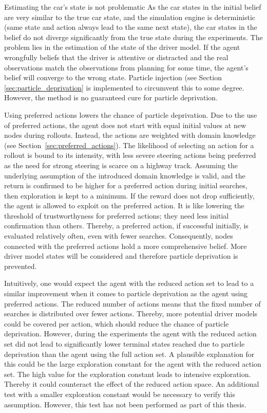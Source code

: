 Estimating the car's state is not problematic As the car states in the initial belief are very similar to the true car state, and the simulation engine is deterministic (same state and action always lead to the same next state), the car states in the belief do not diverge significantly from the true state during the experiments. The problem lies in the estimation of the state of the driver model. If the agent wrongfully beliefs that the driver is attentive or distracted and the real observations match the observations from planning for some time, the agent's belief will converge to the wrong state. Particle injection (see Section \ref{sec:particle_deprivation} is implemented to circumvent this to some degree. However, the method is no guaranteed cure for particle deprivation.

Using preferred actions lowers the chance of particle deprivation. Due to the use of preferred actions, the agent does not start with equal initial values at new nodes during rollouts. Instead, the actions are weighted with domain knowledge (see Section~\ref{sec:preferred_actions}). The likelihood of selecting an action for a rollout is bound to its intensity, with less severe steering actions being preferred as the need for strong steering is scarce on a highway track. Assuming the underlying assumption of the introduced domain knowledge is valid, and the return is confirmed to be higher for a preferred action during initial searches, then exploration is kept to a minimum. If the reward does not drop sufficiently, the agent is allowed to exploit on the preferred action. It is like lowering the threshold of trustworthyness for preferred actions; they need less initial confirmation than others. Thereby, a preferred  action, if successful initially, is evaluated relatively often, even with fewer searches. Consequently, nodes connected with the preferred actions hold a more comprehensive belief. More driver model states will be considered and therefore particle deprivation is prevented.

Intuitively, one would expect the agent with the reduced action set to lead to a similar improvement when it comes to particle deprivation as the agent using preferred actions. The reduced number of actions means that the fixed number of searches is distributed over fewer actions. Thereby, more potential driver models could be covered per action, which should reduce the chance of particle deprivation. However, during the experiments the agent with the reduced action set did not lead to significantly lower terminal states reached due to particle deprivation than the agent using the full action set. A plausible explanation for this could be the large exploration constant for the agent with the reduced action set. The high value for the exploration constant leads to intensive exploration. Thereby it could counteract the effect of the reduced action space. An additional test with a smaller exploration constant would be necessary to verify this assumption. However, this test has not been performed as part of this thesis.

